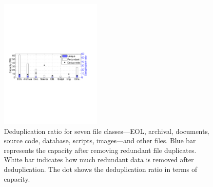 \begin{figure} 
	\centering
	\includegraphics[width=0.45\textwidth]{graphs/dedup-overall} 
	\caption{Deduplication ratio for seven file classes---EOL, archival, documents, source code, database, scripts, images---and other files.
	Blue bar represents the capacity after removing redundant file duplicates. White bar indicates how much redundant data is removed after deduplication. The dot shows the deduplication ratio in terms of capacity.
%
%
%
} 
	\label{fig:dedup-overall} 
\end{figure}


